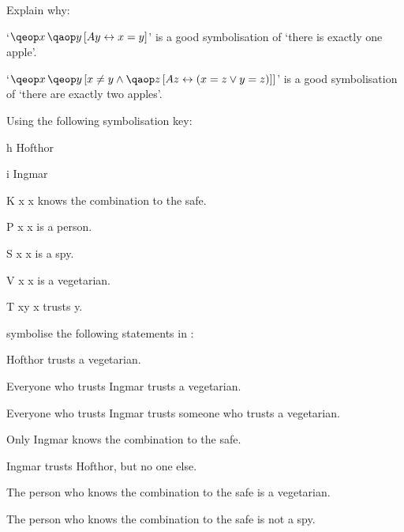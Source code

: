 \documentclass[PHIL101-Textbook.tex]{subfiles}
\begin{document}
\noindent\problempart Explain why:
	\begin{ebullet}
		\item   `$\qe{x}{\qab{y}{\atom A y  \eiff x= y}}$' is a good symbolisation of `there is exactly one apple'.
		\item `$\qe{x}{\qeb{y}{x\neq y \eand \qab{z}{\atom A z  \eiff (x= z \eor y = z)}}}$' is a good symbolisation of `there are exactly two apples'.
	\end{ebullet}		



\noindent\problempart
Using the following symbolisation key:
\begin{ekey}
\item[h] Hofthor
\item[i] Ingmar
\item[\atom K x ] x knows the combination to the safe.
\item[\atom P x ] x is a person.
\item[\atom S x ] x is a spy.
\item[\atom V x ] x is a vegetarian.
\item[\atom T xy ] x trusts y.
\end{ekey}
symbolise the following statements in \pl:
\begin{earg}
\item Hofthor trusts a vegetarian.
\item Everyone who trusts Ingmar trusts a vegetarian.
\item Everyone who trusts Ingmar trusts someone who trusts a vegetarian.
\item Only Ingmar knows the combination to the safe.
\item Ingmar trusts Hofthor, but no one else.
\item The person who knows the combination to the safe is a vegetarian.
\item The person who knows the combination to the safe is not a spy.
\end{earg}
\end{document}
